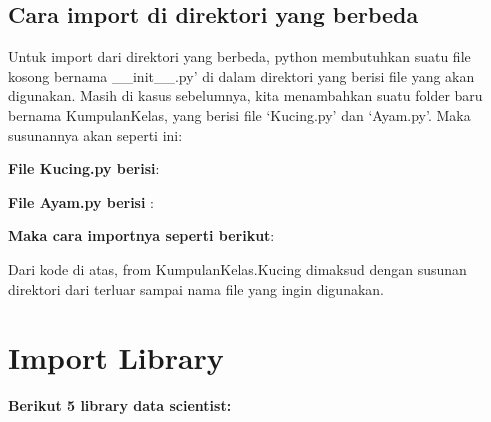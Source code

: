 \subsection{Cara import di direktori yang berbeda}
Untuk import dari direktori yang berbeda, python membutuhkan suatu file kosong bernama \_\_init\_\_.py’ di dalam direktori yang berisi file yang akan digunakan. Masih di kasus sebelumnya, kita menambahkan suatu folder baru bernama KumpulanKelas, yang berisi file ‘Kucing.py’ dan ‘Ayam.py’. Maka susunannya akan seperti ini:

\par \textbf{File Kucing.py berisi}:

\par \textbf{File Ayam.py berisi }:

\par\textbf{Maka cara importnya seperti berikut}:

Dari kode di atas, from KumpulanKelas.Kucing dimaksud dengan susunan direktori dari terluar sampai nama file yang ingin digunakan.
\newpage \section{Import Library}
\textbf{Berikut 5 library data scientist:}
